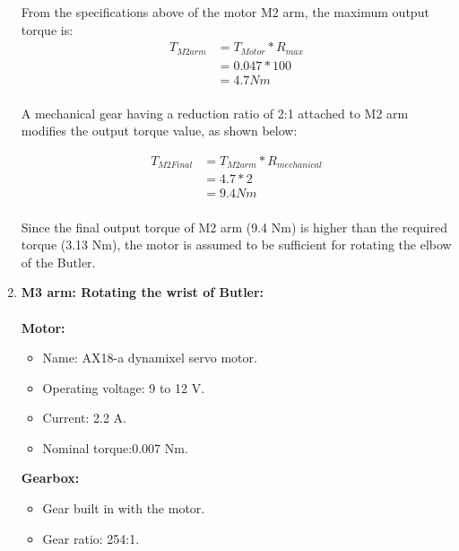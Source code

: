 \begin{enumerate}
     From the specifications above of the motor M2 arm, the maximum output torque is:\\
    \begin{equation} \label{eq: T_M2arm}
    \begin{split}
    T_{M2arm} & = T_{Motor} * R_{max}\\
    & =  0.047 * 100\\
    & = 4.7 Nm\\
    \end{split}
    \end{equation}
    
    A mechanical gear having a reduction ratio of 2:1 attached to M2 arm modifies the output torque value, as shown below:
    
    \begin{equation} \label{eq: T_M2Final}
    \begin{split}
    T_{M2Final} & = T_{M2arm} * R_{mechanical}\\
    & = 4.7 * 2\\
    & = 9.4 Nm\\
    \end{split}
    \end{equation}
    
    Since the final output torque of M2 arm (9.4 Nm) is higher than the required torque (3.13 Nm), the motor is assumed to be sufficient for rotating the elbow of the Butler.\\
    
    \item \textbf {M3 arm: Rotating the wrist of Butler:}\\\\
   \textbf{Motor:}
    \begin{itemize}
        \item Name: AX18-a dynamixel servo motor\cite{servo}.
        \item Operating voltage: 9 to 12 V.
        \item Current: 2.2 A.
        \item Nominal torque:0.007 Nm.\\
    \end{itemize}
    
    \textbf{Gearbox:}
    \begin{itemize}
        \item Gear built in with the motor.
        \item Gear ratio: 254:1.\\
    \end{itemize}
    

\end{enumerate}
